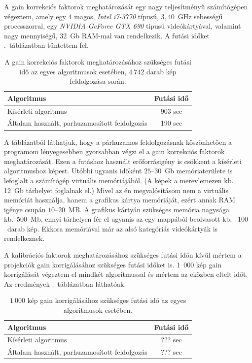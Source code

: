 \documentclass[a4paper,12pt]{article}
\begin{document}
A gain korrekciós faktorok meghatározását egy nagy teljesítményű számítógépen végeztem, amely egy 4 magos, \emph{Intel i7-3770} típusú, $3,\!40$~GHz sebességű processzorral, egy  \emph{NVIDIA GeForce GTX 690} típusú videókártyával, valamint nagy mennyiségű, $32$~Gb RAM-mal van rendelkezik. A futási időket .~táblázatban tüntettem fel. 


\begin{table}[htbp]
\centering
\begin{tabular}{|l|c|}\hline
Algoritmus                                                 & Futási idő               \\ \hline
Kísérleti algoritmus                                       & {903 sec}  \\ \hline
Általam használt, parhuzamosított feldolgozás              & {190 sec} \\ \hline
\end{tabular}
\caption{\label{gainfutas}
A gain korrekciós faktorok meghatározásához szükséges futási idő az egyes algoritmusok esetében, $4~742$ darab kép feldolgozása során.}
\end{table}

A táblázatból láthatjuk, hogy a párhuzamos feldolgozásnak köszönhetően a programom  lényegesebben gyorsabban végzi el a gain korrekciós faktorok meghatározását. Ezen a futáshoz használt erőforrásigény is csökkent a kísérleti algoritmushoz képest. Utóbbi ugyanis időként $25$--$30$~Gb memóriaterülete is lefoglalt a számítógép virtuális memóriájából. (A képek a merevlemezen kb.~ 12~Gb tárhelyet foglalnak el.) Mivel az én megvalósításom nem a virtuális memóriát használja, hanem a grafikus kártya memóriáját, ezért annak RAM igénye csupán $10$--$20$~MB. A grafikus kártyán szükséges memória nagysága kb.\ 500~Mb, ennyi tárhelyen fér el ugyanis az egy mappából beolvasott kb.~ $100$~darab kép. Ekkora memóriával már az alsó kategóriás videókártyák is rendelkeznek.


A kalibrációs  faktorok meghatározásához szükséges futási időn kívül mértem a projekciók gain korrigálásához szükséges futási időket is. 1~000 kép gain korrigálását végeztem el mindkét algoritmussal és mértem az eközben eltelt időt. Az eredmények .~táblázatban láthatóak. 


 \begin{table}[htbp]
\centering
\begin{tabular}{|l|c|}\hline
Algoritmus                                                 & Futási idő               \\ \hline
Kísérleti algoritmus                                       & {??? sec}  \\ \hline
Általam használt, parhuzamosított feldolgozás              & {??? sec} \\ \hline
\end{tabular}
\caption{\label{gainkorrfutas}
$1~000$ kép gain korrigálásához szükséges futási idő az egyes algoritmusok esetében.}
\end{table}
\end{document}
